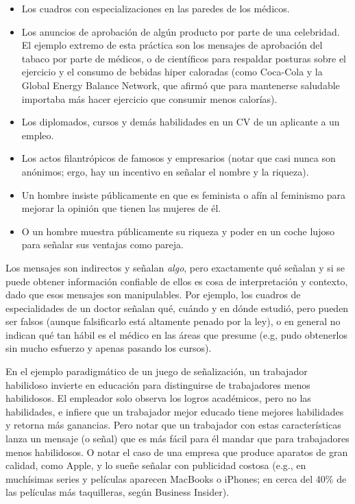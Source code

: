 \documentclass[12pt]{article}
\begin{document}
\begin{itemize}
	\setlength{\itemsep}{0pt}
	\setlength{\parskip}{0pt}
	\setlength{\parsep}{0pt}
	\item Los cuadros con especializaciones en las paredes de los médicos.
	\item Los anuncios de aprobación de algún producto por parte de una celebridad. El ejemplo extremo de esta práctica son los mensajes de aprobación del tabaco por parte de médicos, o de científicos para respaldar posturas sobre el ejercicio y el consumo de bebidas hiper caloradas (como Coca-Cola y la Global Energy Balance Network, que afirmó que para mantenerse saludable importaba más hacer ejercicio que consumir menos calorías).
	\item Los diplomados, cursos y demás habilidades en un CV de un aplicante a un empleo.
	\item Los actos filantrópicos de famosos y empresarios (notar que casi nunca son anónimos; ergo, hay un incentivo en señalar el nombre y la riqueza).
	\item Un hombre insiste públicamente en que es feminista o afín al feminismo para mejorar la opinión que tienen las mujeres de él.
	\item O un hombre muestra públicamente su riqueza y poder en un coche lujoso para señalar sus ventajas como pareja.
\end{itemize}

Los mensajes son indirectos y señalan \textit{algo}, pero exactamente qué señalan y si se puede obtener información confiable de ellos es cosa de interpretación y contexto, dado que esos mensajes son manipulables. Por ejemplo, los cuadros de especialidades de un doctor señalan qué, cuándo y en dónde estudió, pero pueden ser falsos (aunque falsificarlo está altamente penado por la ley), o en general no indican qué tan hábil es el médico en las áreas que presume (e.g, pudo obtenerlos sin mucho esfuerzo y apenas pasando los cursos).

En el ejemplo paradigmático de un juego de señalización, un trabajador habilidoso invierte en educación para distinguirse de trabajadores menos habilidosos. El empleador solo observa los logros académicos, pero no las habilidades, e infiere que un trabajador mejor educado tiene mejores habilidades y retorna más ganancias. Pero notar que un trabajador con estas características lanza un mensaje (o señal) que es más fácil para él mandar que para trabajadores menos habilidosos. O notar el caso de una empresa que produce aparatos de gran calidad, como Apple, y lo sueñe señalar con publicidad costosa (e.g., en muchísimas series y películas aparecen MacBooks o iPhones; en cerca del 40\% de las películas más taquilleras, según Business Insider).
\end{document}
